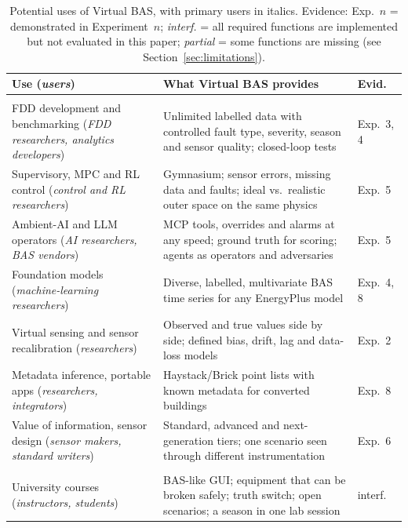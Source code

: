 \documentclass[preprint,12pt,authoryear=false]{elsarticle}
\begin{document}
\begin{table}[p]
\centering
\caption{Potential uses of Virtual BAS, with primary users in italics. Evidence: Exp.~$n$ = demonstrated in
Experiment~$n$; \emph{interf.} = all required functions are implemented but not evaluated in this paper;
\emph{partial} = some functions are missing (see Section~\ref{sec:limitations}).}
\label{tab:uses}
\scriptsize
\renewcommand{\arraystretch}{1.08}
\begin{tabularx}{\textwidth}{@{}>{\raggedright\arraybackslash}p{50mm}>{\raggedright\arraybackslash}X>{\raggedright\arraybackslash}p{14mm}@{}}
\toprule
Use (\emph{users}) & What Virtual BAS provides & Evid. \\
\midrule
\multicolumn{3}{@{}l}{\textbf{Research and development of building AI}}\\
FDD development and benchmarking (\emph{FDD researchers, analytics developers}) & Unlimited labelled data with controlled fault type, severity, season and sensor quality; closed-loop tests & Exp.~3, 4 \\
Supervisory, MPC and RL control (\emph{control and RL researchers}) & Gymnasium; sensor errors, missing data and faults; ideal vs.\ realistic outer space on the same physics & Exp.~5 \\
Ambient-AI and LLM operators (\emph{AI researchers, BAS vendors}) & MCP tools, overrides and alarms at any speed; ground truth for scoring; agents as operators and adversaries & Exp.~5 \\
Foundation models (\emph{machine-learning researchers}) & Diverse, labelled, multivariate BAS time series for any EnergyPlus model \cite{emami2023buildingsbench} & Exp.~4, 8 \\
Virtual sensing and sensor recalibration (\emph{researchers}) & Observed and true values side by side; defined bias, drift, lag and data-loss models & Exp.~2 \\
Metadata inference, portable apps (\emph{researchers, integrators}) & Haystack/Brick point lists with known metadata for converted buildings \cite{gao2015metadata} & Exp.~8 \\
Value of information, sensor design (\emph{sensor makers, standard writers}) & Standard, advanced and next-generation tiers; one scenario seen through different instrumentation & Exp.~6 \\
\multicolumn{3}{@{}l}{\textbf{Education and workforce development}}\\
University courses (\emph{instructors, students}) & BAS-like GUI; equipment that can be broken safely; truth switch; open scenarios; a season in one lab session & interf. \\

\end{tabularx}
\end{table}
\end{document}
